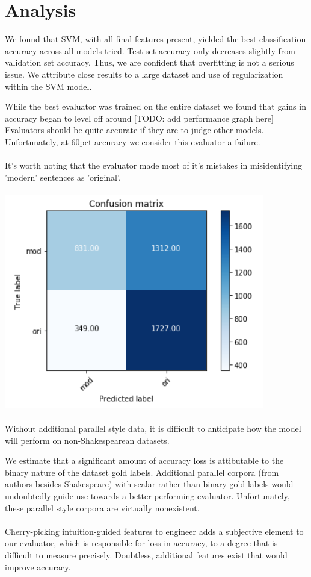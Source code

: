 \documentclass[letterpaper, 10 pt, conference]{ieeeconf}  %
\begin{document}
  \section{Analysis}
  We found that SVM, with all final features present, yielded the best classification accuracy across all models tried. Test set accuracy only decreases slightly from validation set accuracy. Thus, we are confident that overfitting is not a serious issue. We attribute close results to a large dataset and use of regularization within the SVM model.

  While the best evaluator was trained on the entire dataset we found that gains in accuracy began to level off around [TODO: add performance graph here]
  \\
  Evaluators should be quite accurate if they are to judge other models. Unfortunately, at 60pct accuracy we consider this evaluator a failure. \\
  \\
  It's worth noting that the evaluator made most of it's mistakes in misidentifying 'modern' sentences as 'original'.
  \\
  \\
  \includegraphics[scale=.5]{confmat.png}
  \\
  \\
  Without additional parallel style data, it is difficult to anticipate how the model will perform on non-Shakespearean datasets.

  We estimate that a significant amount of accuracy loss is attibutable to the binary nature of the dataset gold labels. Additional parallel corpora (from authors besides Shakespeare) with scalar rather than binary gold labels would undoubtedly guide use towards a better performing evaluator. Unfortunately, these parallel style corpora are virtually nonexistent.
  \\
  \\
  Cherry-picking intuition-guided features to engineer adds a subjective element to our evaluator, which is responsible for loss in accuracy, to a degree that is difficult to measure precisely. Doubtless, additional features exist that would improve accuracy.
\end{document}
